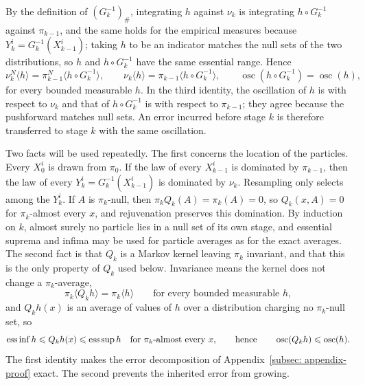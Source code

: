 \documentclass{article}
\begin{document}
By the definition of $(G_k^{-1})_{\#}$, integrating $h$ against $\nu_k$ is integrating $h\circ G_k^{-1}$ against $\pi_{k-1}$, and the same holds for the empirical measures because $Y_k^i=G_k^{-1}(X_{k-1}^i)$; taking $h$ to be an indicator matches the null sets of the two distributions, so $h$ and $h\circ G_k^{-1}$ have the same essential range. Hence
\begin{equation}
    \nu_k^N\langle h\rangle = \pi_{k-1}^N\langle h\circ G_k^{-1}\rangle,
    \qquad
    \nu_k\langle h\rangle = \pi_{k-1}\langle h\circ G_k^{-1}\rangle,
    \qquad
    \operatorname{osc}(h\circ G_k^{-1}) = \operatorname{osc}(h) ,
    \label{eq: appendix-transfer}
\end{equation}
for every bounded measurable $h$. In the third identity, the oscillation of $h$ is with respect to $\nu_k$ and that of $h\circ G_k^{-1}$ is with respect to $\pi_{k-1}$; they agree because the pushforward matches null sets. An error incurred before stage $k$ is therefore transferred to stage $k$ with the same oscillation.

Two facts will be used repeatedly. The first concerns the location of the particles. Every $X_0^i$ is drawn from $\pi_0$. If the law of every $X_{k-1}^i$ is dominated by $\pi_{k-1}$, then the law of every $Y_k^i=G_k^{-1}(X_{k-1}^i)$ is dominated by $\nu_k$. Resampling only selects among the $Y_k^i$. If $A$ is $\pi_k$-null, then $\pi_kQ_k(A)=\pi_k(A)=0$, so $Q_k(x,A)=0$ for $\pi_k$-almost every $x$, and rejuvenation preserves this domination. By induction on $k$, almost surely no particle lies in a null set of its own stage, and essential suprema and infima may be used for particle averages as for the exact averages. The second fact is that $Q_k$ is a Markov kernel leaving $\pi_k$ invariant, and that this is the only property of $Q_k$ used below. Invariance means the kernel does not change a $\pi_k$-average,
\begin{equation}
    \pi_k\langle Q_kh\rangle = \pi_k\langle h\rangle
    \qquad\text{for every bounded measurable } h ,
    \label{eq: appendix-invariance}
\end{equation}
and $Q_kh(x)$ is an average of values of $h$ over a distribution charging no $\pi_k$-null set, so
\begin{equation}
    \operatorname{ess\,inf}h \leqslant Q_kh(x) \leqslant \operatorname{ess\,sup}h
    \quad\text{for } \pi_k\text{-almost every } x ,
    \qquad\text{hence}\qquad
    \operatorname{osc}(Q_kh) \leqslant \operatorname{osc}(h) .
    \label{eq: appendix-contraction}
\end{equation}
The first identity makes the error decomposition of Appendix~\ref{subsec: appendix-proof} exact. The second prevents the inherited error from growing.
\end{document}
